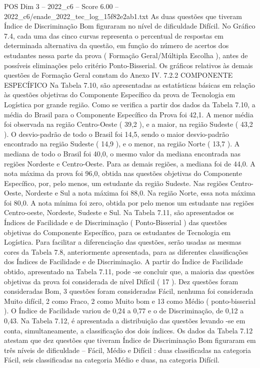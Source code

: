 \begin{textsample}{POS Dim 3 – 2022\_c6 – Score 6.00 – 2022\_c6/enade\_2022\_tec\_log\_15f82e2ab1.txt}
As duas questões que tiveram Índice de Discriminação Bom figuraram no nível de dificuldade Difícil.
No Gráfico 7.4, cada uma das cinco curvas representa o percentual de respostas em determinada alternativa da questão, em função do número de acertos dos estudantes nessa parte da prova ( Formação Geral/Múltipla Escolha ), antes de possíveis eliminações pelo critério Ponto-Bisserial.
Os gráficos relativos às demais questões de Formação Geral constam do Anexo IV. 7.2.2 COMPONENTE ESPECÍFICO Na Tabela 7.10, são apresentadas as estatísticas básicas em relação às questões objetivas do Componente Específico da prova de Tecnologia em Logística por grande região.
Como se verifica a partir dos dados da Tabela 7.10, a média do Brasil para o Componente Específico da Prova foi 42,1.
A menor média foi observada na região Centro-Oeste ( 39,2 ), e a maior, na região Sudeste ( 43,2 ).
O desvio-padrão de todo o Brasil foi 14,5, sendo o maior desvio-padrão encontrado na região Sudeste ( 14,9 ), e o menor, na região Norte ( 13,7 ).
A mediana de todo o Brasil foi 40,0, o mesmo valor da mediana encontrada nas regiões Nordeste e Centro-Oeste.
Para as demais regiões, a mediana foi de 44,0.
A nota máxima da prova foi 96,0, obtida nas questões objetivas do Componente Específico, por, pelo menos, um estudante da região Sudeste.
Nas regiões Centro-Oeste, Nordeste e Sul a nota máxima foi 88,0.
Na região Norte, essa nota máxima foi 80,0.
A nota mínima foi zero, obtida por pelo menos um estudante nas regiões Centro-oeste, Nordeste, Sudeste e Sul.
Na Tabela 7.11, são apresentados os Índices de Facilidade e de Discriminação ( Ponto-Bisserial ) das questões objetivas do Componente Específico, para os estudantes de Tecnologia em Logística.
Para facilitar a diferenciação das questões, serão usadas as mesmas cores da Tabela 7.8, anteriormente apresentada, para as diferentes classificações dos Índices de Facilidade e de Discriminação.
A partir do Índice de Facilidade obtido, apresentado na Tabela 7.11, pode -se concluir que, a maioria das questões objetivas da prova foi considerada de nível Difícil ( 17 ).
Dez questões foram consideradas Bom, 3 questões foram consideradas Fácil, nenhuma foi considerada Muito difícil, 2 como Fraco, 2 como Muito bom e 13 como Médio ( ponto-bisserial ).
O Índice de Facilidade variou de 0,24 a 0,77 e o de Discriminação, de 0,12 a 0,43.
Na Tabela 7.12, é apresentada a distribuição das questões levando -se em conta, simultaneamente, a classificação dos dois índices.
Os dados da Tabela 7.12 atestam que dez questões que tiveram Índice de Discriminação Bom figuraram em três níveis de dificuldade – Fácil, Médio e Difícil : duas classificadas na categoria Fácil, seis classificadas na categoria Médio e duas, na categoria Difícil.

\end{textsample}
